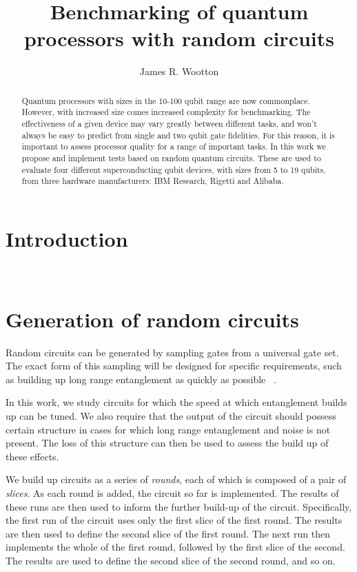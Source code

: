 \documentclass[aps,prl,twocolumn,showpacs,preprintnumbers]{revtex4-1}
\begin{document}
\title{Benchmarking of quantum processors with random circuits}
\author{James R. Wootton}


\begin{abstract}

Quantum processors with sizes in the 10-100 qubit range are now commonplace. However, with increased size comes increased complexity for benchmarking. The effectiveness of a given device may vary greatly between different tasks, and won’t always be  easy to predict from single and two qubit gate fidelities. For this reason, it is important to assess processor quality for a range of important tasks. In this work we propose and implement tests based on random quantum circuits. These are used to evaluate four different superconducting qubit devices, with sizes from 5 to 19 qubits, from three hardware manufacturers: IBM Research, Rigetti and Alibaba.


\end{abstract}


\pacs{}

\maketitle


\section{Introduction}

~\cite{boixo:18}


\section{Generation of random circuits}

Random circuits can be generated by sampling gates from a universal gate set. The exact form of this sampling will be designed for specific requirements, such as building up long range entanglement as quickly as possible ~\cite{boixo:18}.

In this work, we study circuits for which the speed at which entanglement builds up can be tuned. We also require that the output of the circuit should possess certain structure in cases for which long range entanglement and noise is not present. The loss of this structure can then be used to assess the build up of these effects.

We build up circuits as a series of \textit{rounds}, each of which is composed of a pair of \textit{slices}. As each round is added, the circuit so far is implemented. The results of these runs are then used to inform the further build-up of the circuit. Specifically, the first run of the circuit uses only the first slice of the first round. The results are then used to define the second slice of the first round. The next run then implements the whole of the first round, followed by the first slice of the second. The results are used to define the second slice of the second round, and so on.
\end{document}
